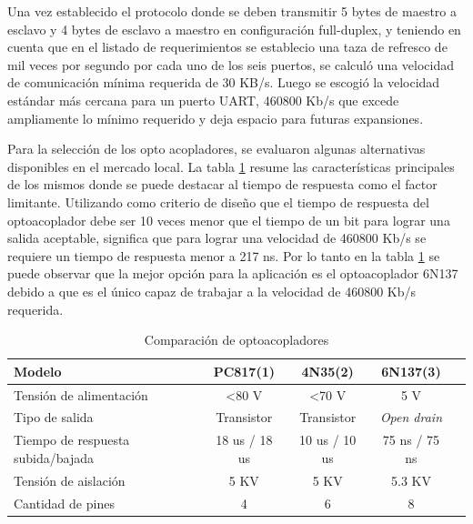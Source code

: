 Una vez establecido el protocolo donde se deben transmitir 5 bytes de maestro a esclavo y 4 bytes de esclavo a maestro en configuración full-duplex, y teniendo en cuenta que en el listado de requerimientos se establecio una taza de refresco de mil veces por segundo por cada uno de los seis puertos, se calculó una velocidad de comunicación mínima requerida de 30 KB/s. Luego se escogió la velocidad estándar más cercana para un puerto UART, 460800 Kb/s que excede ampliamente lo mínimo requerido y deja espacio para futuras expansiones.

Para la selección de los opto acopladores, se evaluaron algunas alternativas disponibles en el mercado local. La tabla \ref{tab:Optos} resume las características principales de los mismos donde se puede destacar al tiempo de respuesta como el factor limitante. 
Utilizando como criterio de diseño que el tiempo de respuesta del optoacoplador debe ser 10 veces menor que el tiempo de un bit para lograr una salida aceptable, significa que para lograr una velocidad de 460800 Kb/s se requiere un tiempo de respuesta menor a 217 ns. Por lo tanto en la tabla \ref{tab:Optos} se puede observar que la mejor opción para la aplicación es el optoacoplador 6N137 debido a que es el único capaz de trabajar a la velocidad de 460800 Kb/s requerida.

	\begin{table}[h]
	\centering
	\caption[Tabla de comparación de optoacopladores para la interfaz UART optoaislada]{Comparación de optoacopladores}
	\begin{tabular}{l c c c c}    
		\toprule
		\textbf{Modelo} 	 & \textbf{PC817(1)} & \textbf{4N35(2)}& \textbf{6N137(3)}	\\
		\midrule
Tensión de alimentación             & \textless{}80 V & \textless{}70 V & 5 V           &  \\
Tipo de salida                      & Transistor      & Transistor      & \emph{Open drain}    &  \\
Tiempo de respuesta subida/bajada & 18 us / 18 us   & 10 us / 10 us   & 75 ns / 75 ns &  \\
Tensión de aislación                & 5 KV            & 5 KV            & 5.3 KV        &  \\
Cantidad de pines                   & 4               & 6               & 8             & \\
		\bottomrule
		\hline
	\end{tabular}
	\label{tab:Optos}
\end{table}

